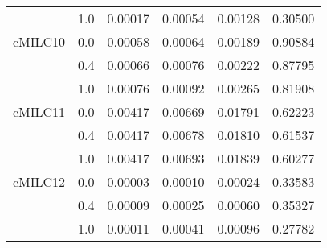 \begin{longtable}{cccccc}
     & 1.0 & 0.00017 & 0.00054 & 0.00128 & 0.30500 \\
cMILC10 & 0.0 & 0.00058 & 0.00064 & 0.00189 & 0.90884 \\
     & 0.4 & 0.00066 & 0.00076 & 0.00222 & 0.87795 \\
     & 1.0 & 0.00076 & 0.00092 & 0.00265 & 0.81908 \\
cMILC11 & 0.0 & 0.00417 & 0.00669 & 0.01791 & 0.62223 \\
     & 0.4 & 0.00417 & 0.00678 & 0.01810 & 0.61537 \\
     & 1.0 & 0.00417 & 0.00693 & 0.01839 & 0.60277 \\
cMILC12 & 0.0 & 0.00003 & 0.00010 & 0.00024 & 0.33583 \\
     & 0.4 & 0.00009 & 0.00025 & 0.00060 & 0.35327 \\
     & 1.0 & 0.00011 & 0.00041 & 0.00096 & 0.27782 \\
\end{longtable}
